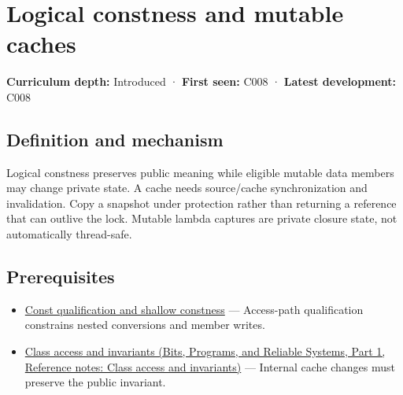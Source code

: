 \hypertarget{appendix-f5593256bcaf}{}\label{referencestart:appendix-f5593256bcaf}
\section{Logical constness and mutable caches}\label{appendix-f5593256bcaf-logical-constness-and-mutable-caches}

\hypertarget{appendix-f5593256bcaf-logical-constness-and-mutable-caches}{}

\textbf{Curriculum depth:} Introduced · \textbf{First seen:} C008 · \textbf{Latest development:} C008

\begin{allmightroledefinition}

\subsection{Definition and mechanism}\label{appendix-f5593256bcaf-definition-and-mechanism}

\hypertarget{appendix-f5593256bcaf-definition-and-mechanism}{}

Logical constness preserves public meaning while eligible mutable data members may change private state. A cache needs source/cache synchronization and invalidation. Copy a snapshot under protection rather than returning a reference that can outlive the lock. Mutable lambda captures are private closure state, not automatically thread-safe.

\end{allmightroledefinition}

\subsection{Prerequisites}\label{appendix-f5593256bcaf-prerequisites}

\hypertarget{appendix-f5593256bcaf-prerequisites}{}

\begin{itemize}
\tightlist
\item
  \hyperref[appendix-c25d60fed375]{Const qualification and shallow constness} --- Access-path qualification constrains nested conversions and member writes.
\item
  \href{../01-Bits-Programs-and-Reliable-Systems-P01/main.pdf\#nameddest=appendix-8e5214819615}{Class access and invariants (Bits, Programs, and Reliable Systems, Part 1, Reference notes: Class access and invariants)} --- Internal cache changes must preserve the public invariant.
\end{itemize}

